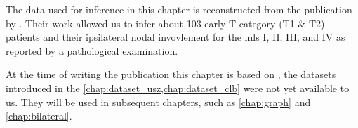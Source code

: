 \begin{tcolorbox}[
    title=\faIcon{database} Data,
    parbox=false,
    float
]
    The data used for inference in this chapter is reconstructed from the publication by . Their work allowed us to infer about 103 early T-category (T1 \& T2) patients and their ipsilateral nodal invovlement for the \glspl{lnl} I, II, III, and IV as reported by a pathological examination.

    At the time of writing the publication this chapter is based on \cite{ludwig_hidden_2021}, the datasets introduced in the \cref{chap:dataset_usz,chap:dataset_clb} were not yet available to us. They will be used in subsequent chapters, such as \cref{chap:graph} and \cref{chap:bilateral}.
\end{tcolorbox}

